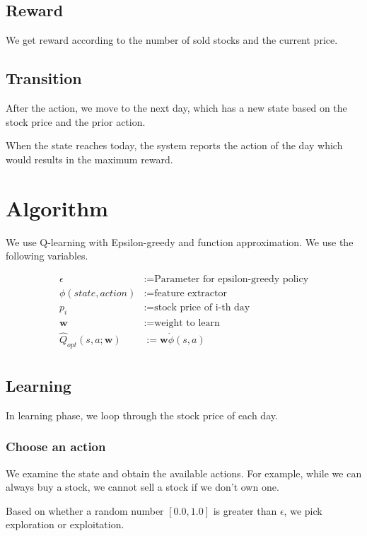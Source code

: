 \documentclass[12pt]{article}
\newcommand{\vect}[1]{\boldsymbol{#1}}
\begin{document}
\subsection{Reward}

We get reward according to the number of sold stocks and the
current price. 

\subsection{Transition}

After the action, we move to the next day, which has a new state based
on the stock price and the prior action.

When the state reaches today, the system reports the action of the day
which would results in the maximum reward.

\section{Algorithm}

We use Q-learning with Epsilon-greedy and function approximation. We
use the following variables.

\begin{align*}
  \epsilon &:= \text{Parameter for epsilon-greedy policy} \\
  \phi(state,action) &:= \text{feature extractor} \\
  p_i &:= \text{stock price of i-th day} \\
  \vect{w} &:= \text{weight to learn} \\
  \hat{Q}_{opt}(s, a; \vect{w}) &:= \vect{w} \dot \phi(s, a) \\
\end{align*}

\subsection{Learning}

In learning phase, we loop through the stock price of each day.

\subsubsection*{Choose an action}

We examine the state and obtain the available actions. For example, while we can always buy a stock, we cannot sell a
stock if we don't own one.

Based on whether a random number $[0.0, 1.0]$ is greater than
$\epsilon$, we pick exploration or exploitation.
\end{document}
